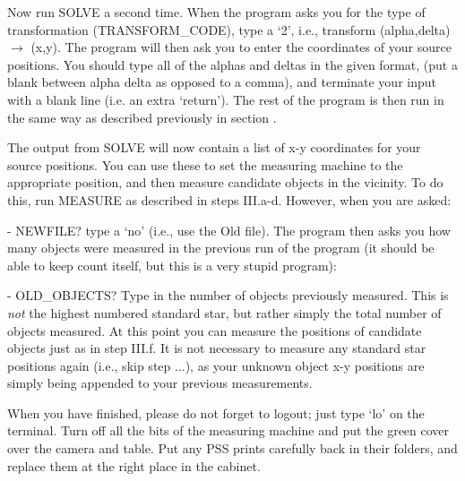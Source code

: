 Now run SOLVE a second time.  When the program asks you for the type of
transformation (TRANSFORM\_CODE), type a `2', i.e., transform (alpha,delta)
$\rightarrow$ (x,y). The program will then ask you to enter the coordinates of
your source positions. You should type all of the alphas and deltas in the
given format, (put a blank between alpha \/ delta as opposed to a comma), and
terminate your input with a blank line (i.e. an extra `return'). The rest of
the program is then run in the same way as described previously in section 
\whichref{}{}. 

The output from SOLVE will now contain a list of x-y coordinates for your
source positions.  You can use these to set the measuring machine to the
appropriate position, and then measure candidate objects in the vicinity.  To
do this, run MEASURE as described in steps III.a-d. However, when you are
asked: 

- NEWFILE? type a `no' (i.e., use the Old file).  The program then asks you how
many objects were measured in the previous run of the program (it should be
able to keep count itself, but this is a very stupid program): 

- OLD\_OBJECTS? Type in the number of objects previously measured.  This is
{\it not} the highest numbered standard star, but rather simply the total
number of objects measured.  At this point you can measure the positions of
candidate objects just as in step III.f.  It is not necessary to measure any
standard star positions again (i.e., skip step ...), as your unknown object x-y
positions are simply being appended to your previous measurements. 

When you have finished, please do not forget to logout; just type `lo' on the
terminal. Turn off all the bits of the measuring machine and put the green
cover over the camera and table. Put any PSS prints carefully back in their
folders, and replace them at the right place in the cabinet. 


